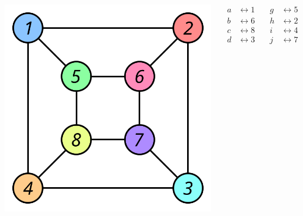 \documentclass{beamer}
\begin{document}
\begin{frame}
\begin{columns}[c]
    \centering
    \includegraphics[scale=0.27]{Graph_isomorphism_b}

    \centering
     {%
      \begin{align*}
        a &\leftrightarrow 1 &\quad g &\leftrightarrow 5 \\
        b &\leftrightarrow 6 &\quad h &\leftrightarrow 2 \\
        c &\leftrightarrow 8 &\quad i &\leftrightarrow 4 \\
        d &\leftrightarrow 3 &\quad j &\leftrightarrow 7
      \end{align*}
    }
  \end{columns}
\end{frame}
\end{document}
